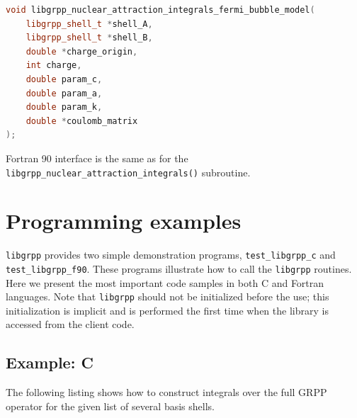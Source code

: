 \documentclass[12pt]{article}
\begin{document}
\begin{lstlisting}[language=C++]
void libgrpp_nuclear_attraction_integrals_fermi_bubble_model(
    libgrpp_shell_t *shell_A,
    libgrpp_shell_t *shell_B,
    double *charge_origin,
    int charge,
    double param_c,
    double param_a,
    double param_k,
    double *coulomb_matrix
);
\end{lstlisting}

Fortran 90 interface is the same as for the \texttt{libgrpp\_nuclear\_attraction\_integrals()} subroutine.


\section{Programming examples}

\texttt{libgrpp} provides two simple demonstration programs, \texttt{test\_libgrpp\_c} and \texttt{test\_libgrpp\_f90}. These programs illustrate how to call the \texttt{libgrpp} routines. Here we present the most important code samples in both C and Fortran languages. Note that \texttt{libgrpp} should not be initialized before the use; this initialization
is implicit and is performed the first time when the library is accessed from the client code.

\subsection{Example: C}

The following listing shows how to construct integrals over the full GRPP operator for the given list of several basis shells.
\end{document}
